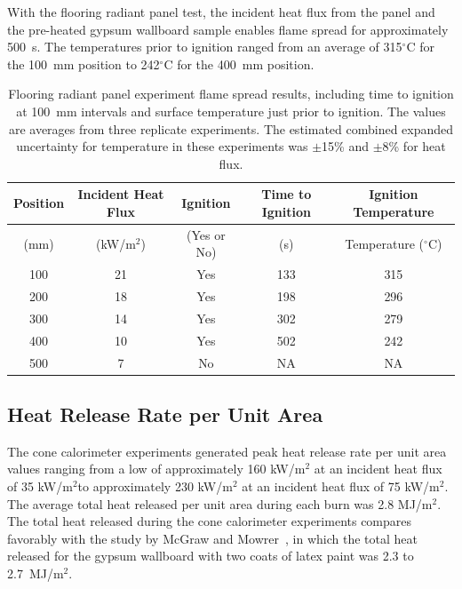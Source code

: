 \documentclass[twoside]{uocthesis}
\begin{document}
{ With the flooring radiant panel test, the incident heat flux from the panel and the pre-heated gypsum wallboard sample enables flame spread for approximately 500~s.  The temperatures prior to ignition ranged from an average of 315$^{\circ}$C for the 100~mm position to 242$^{\circ}$C for the 400~mm position.      
 
      
\begin{table}
	\centering
	\small
	\begin{tabular}{|c|c|c|c|c|}
		\hline Position & Incident Heat Flux & Ignition & Time to Ignition & Ignition Temperature \\
		\hline (mm) & (kW/m$^2$) & (Yes or No) & (s)  & Temperature ($^{\circ}$C)   \\ 
		\hline 100 	& 21	& Yes 	& 133	& 315 	 \\
		\hline 200	& 18 	& Yes 	& 198 	& 296 	 \\
		\hline 300	& 14	& Yes 	& 302 	& 279 	 \\
		\hline 400	& 10	& Yes 	& 502 	& 242 	 \\
		\hline 500	&  7	& No 	& NA 	& NA   	 \\
		\hline
	\end{tabular}
	\caption[Flooring radiant panel experiment flame spread results]{Flooring radiant panel experiment flame spread results, including time to ignition at 100~mm intervals and surface temperature just prior to ignition.  The values are averages from three replicate experiments.  The estimated combined expanded uncertainty for temperature in these experiments was $\pm$15\% and $\pm$8\% for heat flux.}
	\label{tab:FRP_timetemp}
\end{table}

\subsection{Heat Release Rate per Unit Area}

The cone calorimeter experiments generated peak heat release rate per unit area values ranging from a low of approximately 160 kW/m$^2$ at an incident heat flux of 35 kW/m$^2$to approximately 230 kW/m$^2$ at an incident heat flux of 75 kW/m$^2$.  The average total heat released per unit area during each burn was 2.8 MJ/m$^2$.  The total heat released during the cone calorimeter experiments compares favorably with the study by McGraw and Mowrer~\cite{McGraw:1999}, in which the total heat released for the gypsum wallboard with two coats of latex paint was 2.3 to 2.7~MJ/m$^2$.      

}
\end{document}
